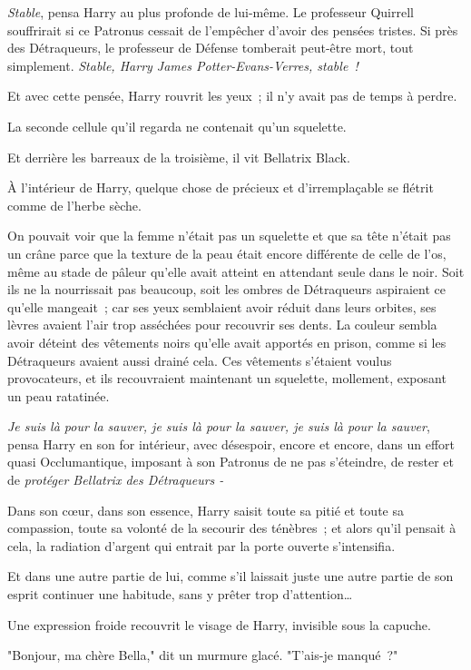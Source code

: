 \emph{Stable}, pensa Harry au plus profonde de lui-même. Le professeur Quirrell souffrirait si ce Patronus cessait de l'empêcher d'avoir des pensées tristes. Si près des Détraqueurs, le professeur de Défense tomberait peut-être mort, tout simplement. \emph{Stable, Harry James Potter-Evans-Verres, stable~!}

Et avec cette pensée, Harry rouvrit les yeux~; il n'y avait pas de temps à perdre.

La seconde cellule qu'il regarda ne contenait qu'un squelette.

Et derrière les barreaux de la troisième, il vit Bellatrix Black.

À l'intérieur de Harry, quelque chose de précieux et d'irremplaçable se flétrit comme de l'herbe sèche.

On pouvait voir que la femme n'était pas un squelette et que sa tête n'était pas un crâne parce que la texture de la peau était encore différente de celle de l'os, même au stade de pâleur qu'elle avait atteint en attendant seule dans le noir. Soit ils ne la nourrissait pas beaucoup, soit les ombres de Détraqueurs aspiraient ce qu'elle mangeait~; car ses yeux semblaient avoir réduit dans leurs orbites, ses lèvres avaient l'air trop asséchées pour recouvrir ses dents. La couleur sembla avoir déteint des vêtements noirs qu'elle avait apportés en prison, comme si les Détraqueurs avaient aussi drainé cela. Ces vêtements s'étaient voulus provocateurs, et ils recouvraient maintenant un squelette, mollement, exposant un peau ratatinée.

\emph{Je suis là pour la sauver, je suis là pour la sauver, je suis là pour la sauver}, pensa Harry en son for intérieur, avec désespoir, encore et encore, dans un effort quasi Occlumantique, imposant à son Patronus de ne pas s'éteindre, de rester et de \emph{protéger Bellatrix des Détraqueurs -}

Dans son cœur, dans son essence, Harry saisit toute sa pitié et toute sa compassion, toute sa volonté de la secourir des ténèbres~; et alors qu'il pensait à cela, la radiation d'argent qui entrait par la porte ouverte s'intensifia.

Et dans une autre partie de lui, comme s'il laissait juste une autre partie de son esprit continuer une habitude, sans y prêter trop d'attention…

Une expression froide recouvrit le visage de Harry, invisible sous la capuche.

"Bonjour, ma chère Bella," dit un murmure glacé. "T'ais-je manqué~?" 

